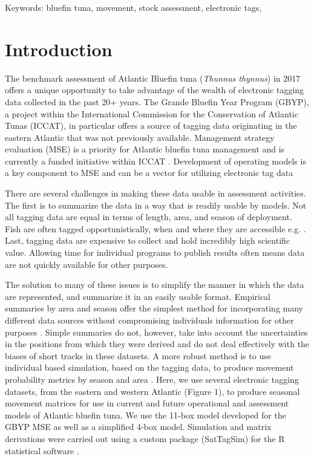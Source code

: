 \documentclass[
  authoryear,
  preprint,
  5p,
  onecolumn]{elsarticle}
\begin{document}
Keywords: bluefin tuna, movement, stock assessment, electronic tags,

\section{Introduction}\label{introduction}

The benchmark assessment of Atlantic Bluefin tuna (\emph{Thunnus
thynnus}) in 2017 offers a unique opportunity to take advantage of the
wealth of electronic tagging data collected in the past 20+ years. The
Grande Bluefin Year Program (GBYP), a project within the International
Commission for the Conservation of Atlantic Tunas (ICCAT), in particular
offers a source of tagging data originating in the eastern Atlantic that
was not previously available. Management strategy evaluation (MSE) is a
priority for Atlantic bluefin tuna management and is currently a funded
initiative within ICCAT \citep{carruthers2014}. Development of operating
models is a key component to MSE and can be a vector for utilizing
electronic tag data \citep{kerr2012a, kerr2016, carruthers2016}

There are several challenges in making these data usable in assessment
activities. The first is to summarize the data in a way that is readily
usable by models. Not all tagging data are equal in terms of length,
area, and season of deployment. Fish are often tagged opportunistically,
when and where they are accessible e.g. \citep[\citet{cermeño2015},
\citet{wilson2015}]{galuardi2012}. Last, tagging data are expensive to
collect and hold incredibly high scientific value. Allowing time for
individual programs to publish results often means data are not quickly
available for other purposes.

The solution to many of these issues is to simplify the manner in which
the data are represented, and summarize it in an easily usable format.
Empirical summaries by area and season offer the simplest method for
incorporating many different data sources without compromising
individuals information for other purposes \citep{carruthers2016a}.
Simple summaries do not, however, take into account the uncertainties in
the positions from which they were derived and do not deal effectively
with the biases of short tracks in these datasets. A more robust method
is to use individual based simulation, based on the tagging data, to
produce movement probability metrics by season and area
\citep{galuardi2014}. Here, we use several electronic tagging datasets,
from the eastern and western Atlantic (Figure 1), to produce seasonal
movement matrices for use in current and future operational and
assessment models of Atlantic bluefin tuna. We use the 11-box model
developed for the GBYP MSE \citep{carruthers2016a} as well as a
simplified 4-box model. Simulation and matrix derivations were carried
out using a custom package (SatTagSim) for the R statistical software
\citep{rcoreteam2024}.
\end{document}
